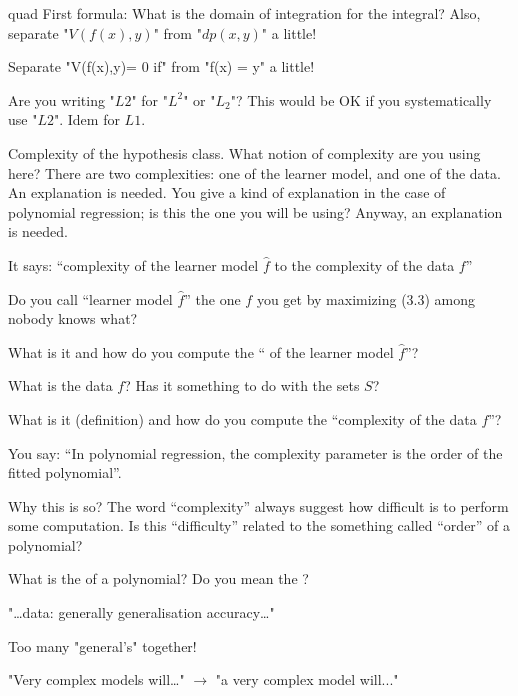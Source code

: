 \begin{description}[style=unboxed,leftmargin=0cm,itemsep=3ex]

quad 
First formula: What is the domain of integration for the integral? 
Also, separate "$V(f(x),y)$" from "$dp(x, y)$" a little!

\vspace{1ex}
\quad Separate "V(f(x),y)= 0 if" from "f(x) = y" a little!

\vspace{1ex}
\quad
Are you writing "$L2$" for "$L^2$" or "$L_2$"?
This would be OK if you systematically use "$L2$". Idem for $L1$.

\vspace{1ex}
\quad
Complexity of the hypothesis class. 
What notion of complexity are you using here?
There are two complexities: one of the learner model, and one of the data.
An explanation is needed.
You give a kind of explanation in the case of polynomial regression; 
is this the one you will be using? 
Anyway, an explanation is needed.

It says: ``complexity of the learner model $\widehat{f}$ to the
complexity of the data $f$''

Do you call ``learner model $\widehat{f}$'' the one $f$ you get by
maximizing (3.3) among nobody knows what?

What is it and how do you compute the `` of the
learner model $\widehat{f}$''?

What is the data $f$?
Has it something to do with the sets $S$?

What is it (definition) and how do you compute the 
``complexity of the data $f$''?

You say: ``In polynomial regression, the complexity parameter is
the order of the fitted polynomial''.

Why this is so?
The word ``complexity'' always suggest how difficult is to perform
some computation.
Is this ``difficulty'' related to the something called ``order''
of a polynomial?

What is the  of a polynomial?
Do you mean the ?

\vspace{1ex}
\quad
"\dots data: generally generalisation accuracy\dots"

Too many "general's" together!

\vspace{1ex}
\quad
"Very complex models will\dots"
\quad$\longrightarrow$\quad
"a very complex model will..." 


\end{description}
